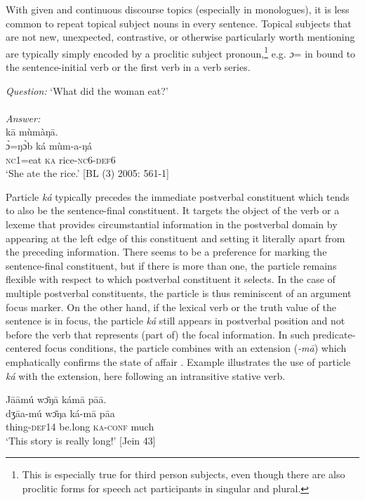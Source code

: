 \documentclass[output=paper]{langsci/langscibook}
\begin{document}
With given and continuous discourse topics (especially in monologues), it is less common to repeat topical subject nouns in every sentence. Topical subjects that are not new, unexpected, contrastive, or otherwise particularly worth mentioning are typically simply encoded by a proclitic subject pronoun,\footnote{This is especially true for third person subjects, even though there are also proclitic forms for speech act participants in singular and plural.} e.g. \textit{ɔ}= in  bound to the sentence-initial verb or the first verb in a verb series. 

\ea\label{ex:schwarz:8}
\textit{Question:} `What did the woman eat?'\\
\textup{ } \\
\textit{Answer:}\\
  k\={a}  mùmàŋ\={a}.\\
  \textup{\`ɔ=ŋ\`ɔb}    {ká}  {mùm-a-ŋá}\\
     \textsc{nc1}=eat  \textsc{ka}  rice-\textsc{nc}6-\textsc{def}6\\
\glt ‘She ate the rice.’ [BL (3) 2005: 561-1]
\z

Particle \textit{ká} typically precedes the immediate postverbal constituent which tends to also be the sentence-final constituent. It targets the object of the verb or a lexeme that provides circumstantial information in the postverbal domain by appearing at the left edge of this constituent and setting it literally apart from the preceding information. There seems to be a preference for marking the sentence-final constituent, but if there is more than one, the particle remains flexible with respect to which postverbal constituent it selects. In the case of multiple postverbal constituents, the particle is thus reminiscent of an argument focus marker. On the other hand, if the lexical verb or the truth value of the sentence is in focus, the particle \textit{ká} still appears in postverbal position and not before the verb that represents (part of) the focal information. In such predicate-centered focus conditions, the particle combines with an extension (\textit{-m\={a}}) which emphatically confirms the state of affair \citep{Schwarz2010b}. Example  illustrates the use of particle \textit{ká} with the extension, here following an intransitive stative verb.

\ea\label{ex:schwarz:9}
\glll   J\={a}\={a}mú    w\={ɔ}ŋ\={a}    kám\={a}    p\={a}\={a}.\\
  \textup{dʒ\={a}a-mú}  w\={ɔ}ŋa    {ká-m\={a}}    {p\={a}a}\\
thing-\textsc{def}14  be.long  \textsc{ka}-\textsc{conf}  much\\
\glt ‘This story is really long!’ [Jein 43]
\z
\end{document}
